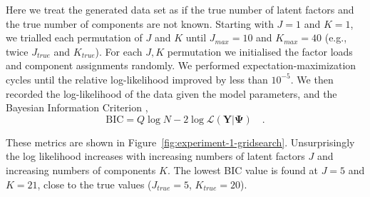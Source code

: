 \documentclass[twocolumn]{aastex61}
\newcommand{\vect}[1]{\boldsymbol{\mathbf{#1}}}
\renewcommand{\vec}[1]{\vect{#1}}
\newcommand{\data}{\textbf{Y}}
\newcommand{\NumLatentFactors}{J}
\newcommand{\NumComponents}{K}
\begin{document}



Here we treat the generated data set as if the true number of latent factors
and the true number of components are not known. Starting with $\NumLatentFactors = 1$
and $\NumComponents = 1$, we trialled each permutation of $\NumLatentFactors$ and $\NumComponents$
until $\NumLatentFactors_{max} = 10$
and   $\NumComponents_{max} = 40$ (e.g., twice $\NumLatentFactors_{true}$ and $\NumComponents_{true}$).
For each $\NumLatentFactors,\NumComponents$ permutation we initialised the factor
loads and component assignments randomly. We performed expectation-maximization 
cycles until the relative log-likelihood improved by less than $10^{-5}$. We then
recorded the log-likelihood of the data given the model parameters, and the
Bayesian Information Criterion \citep{bic}, 
\begin{equation}
	\textrm{BIC} = Q\log{N} - 2\log\mathcal{L}\left(\data|\vec\Psi\right) \quad . \label{eq:bic}
\end{equation} 

These metrics are shown in Figure~\ref{fig:experiment-1-gridsearch}.
Unsurprisingly the log likelihood increases with increasing numbers of latent
factors $\NumLatentFactors$ and increasing numbers of components $\NumComponents$.
The lowest BIC value is found at $\NumLatentFactors = 5$
and $\NumComponents = 21$, close to the true values ($\NumLatentFactors_{true} = 5$,
$\NumComponents_{true} = 20$). 
\end{document}
